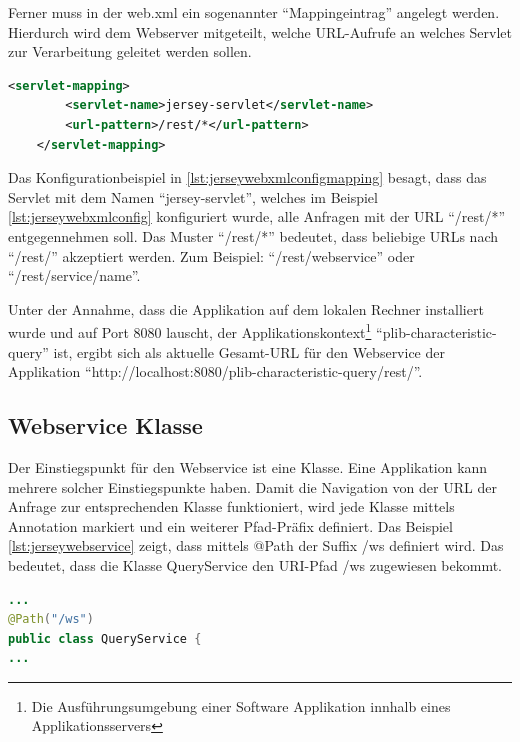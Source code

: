 Ferner muss in der web.xml ein sogenannter \enquote{Mappingeintrag} angelegt werden. Hierdurch wird dem Webserver mitgeteilt, welche \gls{URL}-Aufrufe an welches \gls{Servlet} zur Verarbeitung geleitet werden sollen. 
 
  \begin{lstlisting}[caption=Jersey Servlet Mappingkonfiguration in web.xml, language=XML, label=lst:jerseywebxmlconfigmapping]
    <servlet-mapping>
        <servlet-name>jersey-servlet</servlet-name>
        <url-pattern>/rest/*</url-pattern>
    </servlet-mapping>
 \end{lstlisting}  
 
Das Konfigurationbeispiel in \autoref{lst:jerseywebxmlconfigmapping}  besagt, dass das \gls{Servlet} mit dem Namen \enquote{jersey-servlet}, welches im Beispiel \autoref{lst:jerseywebxmlconfig}  konfiguriert wurde, alle Anfragen mit der URL \enquote{/rest/*} entgegennehmen soll. Das Muster \enquote{/rest/*} bedeutet, dass beliebige URLs nach \enquote{/rest/} akzeptiert werden. Zum Beispiel: \enquote{/rest/webservice} oder \enquote{/rest/service/name}.

Unter der Annahme, dass die Applikation auf dem lokalen Rechner installiert wurde und auf Port 8080 lauscht, der \gls{Applikationskontext}\footnote{Die Ausführungsumgebung einer Software Applikation innhalb eines Applikationsservers} \enquote{plib-characteristic-query} ist, ergibt sich als aktuelle Gesamt-URL für den \gls{Webservice} der Applikation \enquote{http://localhost:8080/plib-characteristic-query/rest/}.

\subsection{Webservice Klasse}
Der Einstiegspunkt für den \gls{Webservice} ist eine Klasse. Eine Applikation kann mehrere solcher Einstiegspunkte haben. Damit die Navigation von der \gls{URL} der Anfrage zur entsprechenden Klasse funktioniert, wird jede Klasse mittels Annotation markiert und ein weiterer Pfad-Präfix definiert. Das Beispiel 
\autoref{lst:jerseywebservice} zeigt, dass mittels @Path der Suffix /ws definiert wird. Das bedeutet, dass die Klasse QueryService den \gls{URI}-Pfad /ws zugewiesen bekommt. 
  \begin{lstlisting}[caption=Jersey Webservice Klasse, language=Java, label=lst:jerseywebservice]
...
@Path("/ws")
public class QueryService {
...
 \end{lstlisting}  
 
